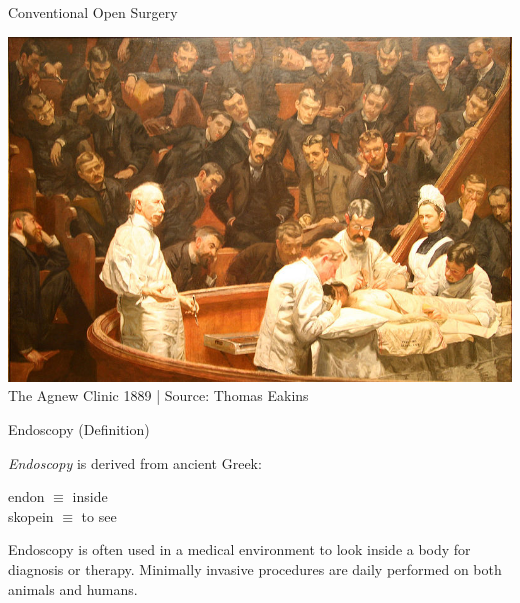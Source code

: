 \begin{frame}{Conventional Open Surgery}

	\begin{center}
		\includegraphics[height=.8\textheight ]{images/painting}\\
		\scriptsize The Agnew Clinic 1889 | Source: Thomas Eakins
	\end{center}

\end{frame}



\begin{frame}{Endoscopy (Definition)}

	\begin{myDefinition}
		\textit{Endoscopy} is derived from ancient Greek:
		\begin{center}
			endon $\equiv$ inside\\
			skopein $\equiv$ to see
		\end{center}
		\bigskip
		Endoscopy is often used in a medical environment to look inside a body for diagnosis or therapy. Minimally invasive procedures are daily performed on both animals and humans.
	\end{myDefinition}
\end{frame}




